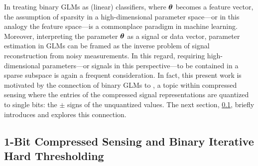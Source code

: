 In treating binary GLMs as (linear) classifiers, where \(  \thetaX  \) becomes a feature vector, the assumption of sparsity in a high-dimensional parameter space---or in
this analogy
the feature space---is a commonplace paradigm in machine learning.
Moreover, interpreting the parameter \(  \thetaX  \) as a signal or data vector, parameter estimation in GLMs can be framed as
the inverse problem of
signal reconstruction from noisy measurements.
In this regard, requiring high-dimensional parameters---or signals in this perspective---to be contained in a sparse subspace is again a frequent consideration. 
In fact, this present work is motivated by the connection of binary GLMs to \onebitcs, a topic within compressed sensing where the entries of the compressed signal representations are quantized to single bits: the \(  \pm  \) signs of the unquantized values.
The next section, \SECTION \ref{outline:intro|>1bcs}, briefly introduces \onebitcs and explores this connection.


\subsection{1-Bit Compressed Sensing and Binary Iterative Hard Thresholding}
\label{outline:intro|>1bcs}

